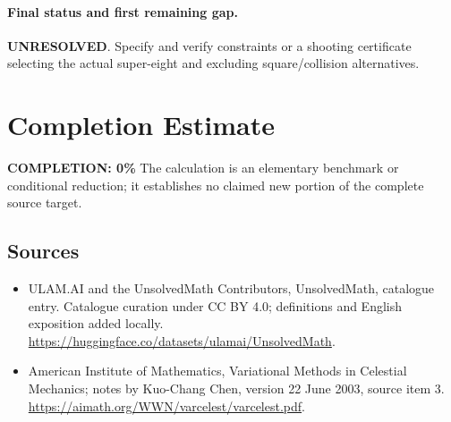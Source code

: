 \documentclass[11pt]{article}
\begin{document}
\paragraph{Final status and first remaining gap.}
\textbf{UNRESOLVED}. Specify and verify constraints or a shooting certificate selecting the actual super-eight and excluding square/collision alternatives.

\section{Completion Estimate}
\noindent\textbf{COMPLETION: 0\%}
The calculation is an elementary benchmark or conditional reduction; it establishes no claimed new portion of the complete source target.

\subsection{Sources}
\begin{itemize}
\item[\hypertarget{source:statement:1}{S1}] ULAM.AI and the UnsolvedMath Contributors, UnsolvedMath, catalogue entry. Catalogue curation under CC BY 4.0; definitions and English exposition added locally.
\url{https://huggingface.co/datasets/ulamai/UnsolvedMath}.
\item[\hypertarget{source:statement:2}{S2}] American Institute of Mathematics, Variational Methods in Celestial Mechanics; notes by Kuo-Chang Chen, version 22 June 2003, source item 3.
\url{https://aimath.org/WWN/varcelest/varcelest.pdf}.
\end{itemize}
\label{end:statement}
\end{document}
